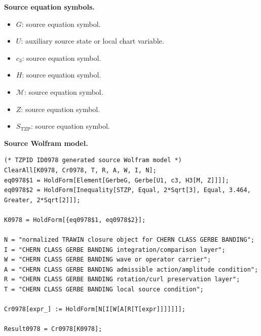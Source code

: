 \begin{minipage}[t]{0.49\linewidth}
\begingroup
\small
\raggedright
\textbf{Source equation symbols.}\par
\begin{itemize}[leftmargin=1.35em,itemsep=1pt,topsep=1pt,parsep=0pt]
    \item $G$: source equation symbol.
    \item $U$: auxiliary source state or local chart variable.
    \item $c_3$: source equation symbol.
    \item $H$: source equation symbol.
    \item $\mathcal{M}$: source equation symbol.
    \item $Z$: source equation symbol.
    \item $S_{\mathrm{TZP}}$: source equation symbol.
\end{itemize}
\endgroup
\end{minipage}\hfill
\begin{minipage}[t]{0.47\linewidth}
\begingroup
\scriptsize
\raggedright
\textbf{Source Wolfram model.}\par
\begin{Verbatim}[fontsize=\tiny,breaklines=true,breakanywhere=true]
(* TZPID ID0978 generated source Wolfram model *)
ClearAll[K0978, Cr0978, T, R, A, W, I, N];
eq0978$1 = HoldForm[Element[GerbeG, Gerbe[U1, c3, H3[M, Z]]]];
eq0978$2 = HoldForm[Inequality[STZP, Equal, 2*Sqrt[3], Equal, 3.464, Greater, 2*Sqrt[2]]];

K0978 = HoldForm[{eq0978$1, eq0978$2}];

N = "normalized TRAWIN closure object for CHERN CLASS GERBE BANDING";
I = "CHERN CLASS GERBE BANDING integration/comparison layer";
W = "CHERN CLASS GERBE BANDING wave or operator carrier";
A = "CHERN CLASS GERBE BANDING admissible action/amplitude condition";
R = "CHERN CLASS GERBE BANDING rotation/curl preservation layer";
T = "CHERN CLASS GERBE BANDING local source condition";

Cr0978[expr_] := HoldForm[N[I[W[A[R[T[expr]]]]]]];

Result0978 = Cr0978[K0978];
\end{Verbatim}
\endgroup
\end{minipage}

